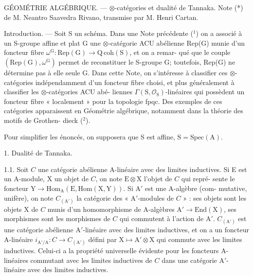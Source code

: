 
GÉOMÉTRIE ALGÉBRIQUE. --- $\otimes$-catégories et dualité de Tannaka.
Note (*) de M. Neantro Saavedra Rivano, transmise par M. Henri
Cartan.

Introduction. --- Soit S un schéma. Dans une Note précédente (${}^{1}$)
on a associé à un S-groupe affine et plat G une $\otimes$-catégorie ACU abélienne
Rep(G) munie d'un foncteur fibre $\omega^{\mathrm{G}} : \mathrm{Rep}(\mathrm{G}) \to \mathrm{Q\,coh}(\mathrm{S})$, et on a remar-%
qué que le couple $(\mathrm{Rep}(\mathrm{G}), \omega^{\mathrm{G}})$ permet de reconstituer le S-groupe G;
toutefois, Rep(G) ne détermine pas à elle seule G. Dans cette Note, on
s'intéresse à classifier ces $\otimes$-catégories indépendamment d'un foncteur
fibre choisi, et plus généralement à classifier les $\otimes$-catégories ACU abé-%
liennes $\Gamma(\mathrm{S}, \mathcal{O}_{\mathrm{S}})$-linéaires qui possèdent un foncteur fibre « localement »
pour la topologie fpqc. Des exemples de ces catégories apparaissent en
Géométrie algébrique, notamment dans la théorie des motifs de Grothen-%
dieck (${}^{2}$).

Pour simplifier les énoncés, on supposera que S est affine, $\mathrm{S} = \mathrm{Spec}(\mathrm{A})$.

1. Dualité de Tannaka.

1.1. Soit $C$ une catégorie abélienne A-linéaire avec des limites inductives.
Si E est un A-module, X un objet de $C$, on note $\mathrm{E} \otimes \mathrm{X}$ l'objet de $C$ qui repré-%
sente le foncteur $\mathrm{Y} \to \mathrm{Hom}_{\mathrm{A}}(\mathrm{E}, \mathrm{Hom}(\mathrm{X}, \mathrm{Y}))$. Si A$'$ est une A-algèbre (com-%
mutative, unifère), on note $C_{(\mathrm{A}')}$ la catégorie des « A$'$-modules de $C$ » : ses
objets sont les objets X de $C$ munis d'un homomorphisme de A-algèbres
$\mathrm{A}' \to \mathrm{End}(\mathrm{X})$, ses morphismes sont les morphismes de $C$ qui commutent
à l'action de A$'$. $C_{(\mathrm{A}')}$ est une catégorie abélienne A$'$-linéaire avec des limites
inductives, et on a un foncteur A-linéaire $i_{\mathrm{A}'/\mathrm{A}} : C \to C_{(\mathrm{A}')}$ défini par
$\mathrm{X} \mapsto \mathrm{A}' \otimes \mathrm{X}$ qui commute avec les limites inductives. Celui-ci a la propriété
universelle évidente pour les foncteurs A-linéaires commutant avec les
limites inductives de $C$ dans une catégorie A$'$-linéaire avec des limites
inductives.

